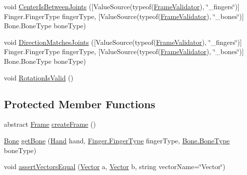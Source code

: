 \begin{DoxyCompactItemize}
\item 
void \mbox{\hyperlink{class_leap_1_1_unity_1_1_tests_1_1_frame_validator_a3c1a4a5978be1544fc8b0570f4b31218}{Center\+Is\+Between\+Joints}} (\mbox{[}Value\+Source(typeof(\mbox{\hyperlink{class_leap_1_1_unity_1_1_tests_1_1_frame_validator}{Frame\+Validator}}), \char`\"{}\+\_\+fingers\char`\"{})\mbox{]} Finger.\+Finger\+Type finger\+Type, \mbox{[}Value\+Source(typeof(\mbox{\hyperlink{class_leap_1_1_unity_1_1_tests_1_1_frame_validator}{Frame\+Validator}}), \char`\"{}\+\_\+bones\char`\"{})\mbox{]} Bone.\+Bone\+Type bone\+Type)
\item 
void \mbox{\hyperlink{class_leap_1_1_unity_1_1_tests_1_1_frame_validator_ad4790f2f0631567aaced9032c3bd5f4f}{Direction\+Matches\+Joints}} (\mbox{[}Value\+Source(typeof(\mbox{\hyperlink{class_leap_1_1_unity_1_1_tests_1_1_frame_validator}{Frame\+Validator}}), \char`\"{}\+\_\+fingers\char`\"{})\mbox{]} Finger.\+Finger\+Type finger\+Type, \mbox{[}Value\+Source(typeof(\mbox{\hyperlink{class_leap_1_1_unity_1_1_tests_1_1_frame_validator}{Frame\+Validator}}), \char`\"{}\+\_\+bones\char`\"{})\mbox{]} Bone.\+Bone\+Type bone\+Type)
\item 
void \mbox{\hyperlink{class_leap_1_1_unity_1_1_tests_1_1_frame_validator_a5c9a107fa1376dbb6eeb458330e35fcf}{Rotation\+Is\+Valid}} ()
\end{DoxyCompactItemize}
\subsection*{Protected Member Functions}
\begin{DoxyCompactItemize}
\item 
abstract \mbox{\hyperlink{class_leap_1_1_frame}{Frame}} \mbox{\hyperlink{class_leap_1_1_unity_1_1_tests_1_1_frame_validator_ae397067480c6fd2183160f048094e466}{create\+Frame}} ()
\item 
\mbox{\hyperlink{class_leap_1_1_bone}{Bone}} \mbox{\hyperlink{class_leap_1_1_unity_1_1_tests_1_1_frame_validator_a829eb479c186cf2791b4983128f460b7}{get\+Bone}} (\mbox{\hyperlink{class_leap_1_1_hand}{Hand}} hand, \mbox{\hyperlink{class_leap_1_1_finger_ae75e8d46a01aff0bd5c6d6fb99e2f2ba}{Finger.\+Finger\+Type}} finger\+Type, \mbox{\hyperlink{class_leap_1_1_bone_a21054e31cefa7b75f25a026006fdbb1b}{Bone.\+Bone\+Type}} bone\+Type)
\item 
void \mbox{\hyperlink{class_leap_1_1_unity_1_1_tests_1_1_frame_validator_ad7ea32888c180b40f2c0a01bbbb97a82}{assert\+Vectors\+Equal}} (\mbox{\hyperlink{struct_leap_1_1_vector}{Vector}} a, \mbox{\hyperlink{struct_leap_1_1_vector}{Vector}} b, string vector\+Name=\char`\"{}Vector\char`\"{})
\end{DoxyCompactItemize}
